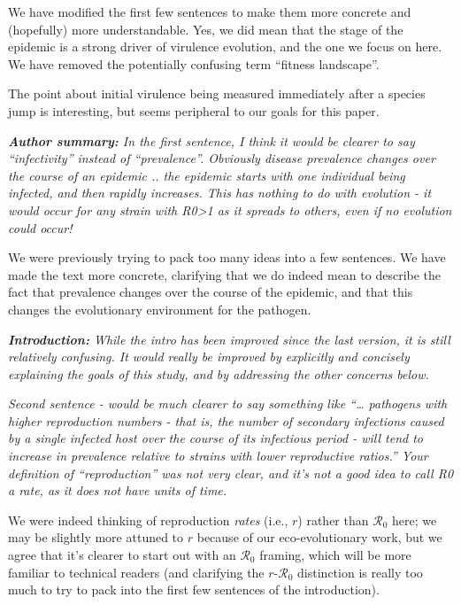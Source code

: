 \documentclass[10pt]{letter}
\newcommand{\revcomment}[1]{\emph{#1}}
\newcommand{\response}[1]{#1}
\newcommand{\rzero}{\ensuremath{\mathcal R}_0}
\begin{document}
\begin{letter}{
}
\response{We have modified the first few sentences to make them
more concrete and (hopefully) more understandable. 
Yes, we did mean that the stage of the epidemic is a strong
driver of virulence evolution, and the one we focus on here.
We have removed the potentially confusing term ``fitness landscape''.

The point about initial virulence being measured immediately after
a species jump is interesting, but seems peripheral
to our goals for this paper.
}

\revcomment{
\textbf{Author summary:} In the first sentence, I think it would be clearer to say “infectivity” instead of “prevalence”. Obviously disease prevalence changes over the course of an epidemic .. the epidemic starts with one individual being infected, and then rapidly increases. This has nothing to do with evolution - it would occur for any strain with R0>1 as it spreads to others, even if no evolution could occur!
}

\response{We were previously trying to pack too many ideas into a few sentences. We have made the text more concrete, clarifying that we do indeed mean to describe the fact that prevalence changes over the course of the epidemic, and that this changes the evolutionary environment for the pathogen.}

\revcomment{\textbf{Introduction:}
While the intro has been improved since the last version, it is still relatively confusing. It would really be improved by explicitly and concisely explaining the goals of this study, and by addressing the other concerns below.
}

\revcomment{
Second sentence - would be much clearer to say something like “… pathogens with higher reproduction numbers - that is, the number of secondary infections caused by a single infected host over the course of its infectious period - will tend to increase in prevalence relative to strains with lower reproductive ratios.” Your definition of “reproduction” was not very clear, and it’s not a good idea to call R0 a rate, as it does not have units of time.
}

\response{
We were indeed thinking of reproduction \emph{rates} (i.e., $r$) rather than $\rzero$ here; we may be slightly more
attuned to $r$ because of our eco-evolutionary work, but we agree that it's clearer to start out with an $\rzero$
framing, which will be more familiar to technical readers (and clarifying the $r$-$\rzero$ distinction is really too much to try to pack into the first few sentences of the introduction).
}


\end{letter}
\end{document}
